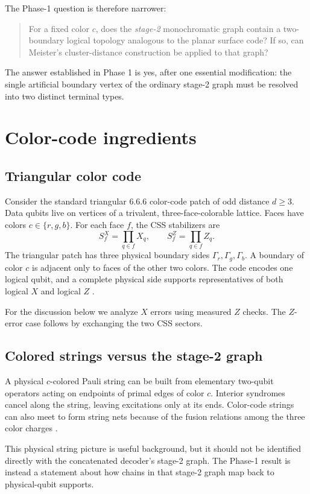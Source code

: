 \documentclass[11pt]{article}
\begin{document}
The Phase-1 question is therefore narrower:
\begin{quote}
For a fixed color $c$, does the \emph{stage-2} monochromatic graph contain a
two-boundary logical topology analogous to the planar surface code? If so,
can Meister's cluster-distance construction be applied to that graph?
\end{quote}

The answer established in Phase 1 is yes, after one essential modification:
the single artificial boundary vertex of the ordinary stage-2 graph must be
resolved into two distinct terminal types.

\section{Color-code ingredients}

\subsection{Triangular color code}

Consider the standard triangular 6.6.6 color-code patch of odd distance
$d\ge 3$. Data qubits live on vertices of a trivalent, three-face-colorable
lattice. Faces have colors $c\in\{r,g,b\}$. For each face $f$, the CSS
stabilizers are
\[
  S_f^X=\prod_{q\in f}X_q,
  \qquad
  S_f^Z=\prod_{q\in f}Z_q.
\]
The triangular patch has three physical boundary sides
$\Gamma_r,\Gamma_g,\Gamma_b$. A boundary of color $c$ is adjacent only to
faces of the other two colors. The code encodes one logical qubit, and a
complete physical side supports representatives of both logical $X$ and
logical $Z$ \cite{Bombin,Lee}.

For the discussion below we analyze $X$ errors using measured $Z$ checks. The
$Z$-error case follows by exchanging the two CSS sectors.

\subsection{Colored strings versus the stage-2 graph}

A physical $c$-colored Pauli string can be built from elementary two-qubit
operators acting on endpoints of primal edges of color $c$. Interior
syndromes cancel along the string, leaving excitations only at its ends.
Color-code strings can also meet to form string nets because of the fusion
relations among the three color charges \cite{Kesselring}.

This physical string picture is useful background, but it should not be
identified directly with the concatenated decoder's stage-2 graph. The
Phase-1 result is instead a statement about how chains in that stage-2 graph
map back to physical-qubit supports.
\end{document}
